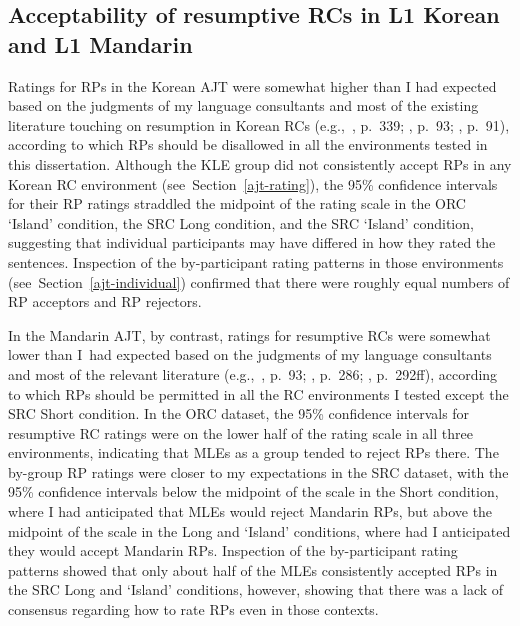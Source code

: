 
\subsection{Acceptability of resumptive RCs in L1 Korean and L1 Mandarin}\label{dis-kozh}

Ratings for RPs in the Korean AJT were somewhat higher than I had expected based on the judgments of my language consultants and most of the existing literature touching on resumption in Korean RCs (e.g.,~\cite{han2013}, p.~339; \cite{keenan.comrie1977}, p.~93; \cite{kim2013}, p.~91), according to which RPs should be disallowed in all the environments tested in this dissertation. Although the KLE group did not consistently accept RPs in any Korean RC environment (see~Section~\ref{ajt-rating}), the 95\% confidence intervals for their RP ratings straddled the midpoint of the rating scale in the ORC `Island' condition, the SRC Long condition, and the SRC `Island' condition, suggesting that individual participants may have differed in how they rated the sentences. Inspection of the by-participant rating patterns in those environments (see~Section~\ref{ajt-individual}) confirmed that there were roughly equal numbers of RP acceptors and RP rejectors.

In the Mandarin AJT, by contrast, ratings for resumptive RCs were somewhat lower than I~had expected based on the judgments of my language consultants and most of the relevant literature (e.g.,~\cite{keenan.comrie1977}, p.~93; \cite{li.wei2014}, p.~286; \cite{pan2016}, p.~292ff), according to which RPs should be permitted in all the RC environments I tested except the SRC Short condition. In the ORC dataset, the 95\% confidence intervals for resumptive RC ratings were on the lower half of the rating scale in all three environments, indicating that MLEs as a group tended to reject RPs there. The by-group RP ratings were closer to my expectations in the SRC dataset, with the 95\% confidence intervals below the midpoint of the scale in the Short condition, where I had anticipated that MLEs would reject Mandarin RPs, but above the midpoint of the scale in the Long and `Island' conditions, where had I anticipated they would accept Mandarin RPs. Inspection of the by-participant rating patterns showed that only about half of the MLEs consistently accepted RPs in the SRC Long and `Island' conditions, however, showing that there was a lack of consensus regarding how to rate RPs even in those contexts.\footnotemark{}

